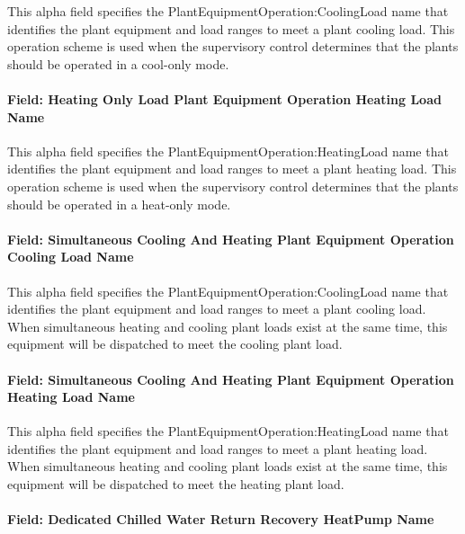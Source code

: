 This alpha field specifies the PlantEquipmentOperation:CoolingLoad name that identifies the plant equipment and load ranges to meet a plant cooling load. This operation scheme is used when the supervisory control determines that the plants should be operated in a cool-only mode. 

\paragraph{Field: Heating Only Load Plant Equipment Operation Heating Load Name}\label{field-heat-only-load-equip-operation-name-plantequipmentoperationchillerheaterchangeover}

This alpha field specifies the PlantEquipmentOperation:HeatingLoad name that identifies the plant equipment and load ranges to meet a plant heating load. This operation scheme is used when the supervisory control determines that the plants should be operated in a heat-only mode. 

\paragraph{Field: Simultaneous Cooling And Heating Plant Equipment Operation Cooling Load Name}\label{field-simulataneous-cooling-and-heating-plant-equip-operation-name-plantequipmentoperationchillerheaterchangeover}

This alpha field specifies the PlantEquipmentOperation:CoolingLoad name that identifies the plant equipment and load ranges to meet a plant cooling load. When simultaneous heating and cooling plant loads exist at the same time, this equipment will be dispatched to meet the cooling plant load.

\paragraph{Field: Simultaneous Cooling And Heating Plant Equipment Operation Heating Load Name}\label{field-simulataneous-cooling-and-heating-plant-equip-operation-name-plantequipmentoperationchillerheaterchangeover}

This alpha field specifies the PlantEquipmentOperation:HeatingLoad name that identifies the plant equipment and load ranges to meet a plant heating load. When simultaneous heating and cooling plant loads exist at the same time, this equipment will be dispatched to meet the heating plant load.

\paragraph{Field: Dedicated Chilled Water Return Recovery HeatPump Name}\label{field-dedicated-chilled-return-recovery-hp-name-plantequipmentoperationchillerheaterchangeover}

